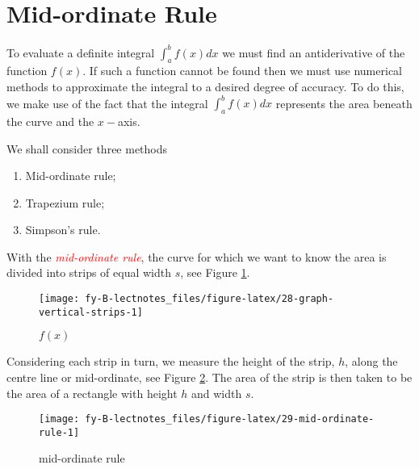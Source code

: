 \documentclass[
  11pt,
  oneside]{book}
\providecommand{\tightlist}{%
  \setlength{\itemsep}{0pt}\setlength{\parskip}{0pt}}
\newcommand{\slide}{}
\theoremstyle{definition}
\theoremstyle{definition}
\theoremstyle{definition}
\theoremstyle{definition}
\theoremstyle{remark}
\begin{document}
\slide

\section{Mid-ordinate Rule}\label{mid-ordinate-rule}

To evaluate a definite integral \(\displaystyle\int_a^bf(x)dx\) we must find an antiderivative of the function \(f(x)\). If such a function cannot be found then we must use numerical methods to approximate the integral to a desired degree of accuracy. To do this, we make use of the fact that the integral \(\displaystyle\int_a^bf(x)dx\) represents the area beneath the curve and the \(x-\)axis.

We shall consider three methods

\begin{enumerate}
\def\labelenumi{\arabic{enumi}.}
\tightlist
\item
  Mid-ordinate rule;
\item
  Trapezium rule;
\item
  Simpson's rule.
\end{enumerate}

\slide

With the \textcolor{red}{\em mid-ordinate rule}, the curve for which we want to know the area is divided into strips of equal width \(s\), see Figure \ref{fig:28-graph-vertical-strips}.

\begin{figure}

{\centering \texttt{[image: fy-B-lectnotes\_files/figure-latex/28-graph-vertical-strips-1]} 

}

\caption{$f(x)$}\label{fig:28-graph-vertical-strips}
\end{figure}

Considering each strip in turn, we measure the height of the strip, \(h\), along the centre line or mid-ordinate, see Figure \ref{fig:29-mid-ordinate-rule}. The area of the strip is then taken to be the area of a rectangle with height \(h\) and width \(s\).
\slide

\begin{figure}

{\centering \texttt{[image: fy-B-lectnotes\_files/figure-latex/29-mid-ordinate-rule-1]} 

}

\caption{mid-ordinate rule}\label{fig:29-mid-ordinate-rule}
\end{figure}
\end{document}

